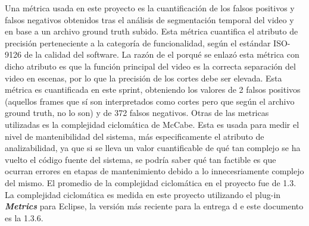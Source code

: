 \documentclass[a4paper]{article}
\begin{document}
Una métrica usada en este proyecto es la cuantificación de los falsos positivos y falsos negativos obtenidos tras el análisis de segmentación temporal del video y en base a un archivo ground truth subido. Esta métrica cuantifica el atributo de precisión perteneciente a la categoría de funcionalidad, según el estándar ISO-9126 de la calidad del software. La razón de el porqué se enlazó esta métrica con dicho atributo es que la función principal del video es la correcta separación del video en escenas, por lo que la precisión de los cortes debe ser elevada. Esta métrica es cuantificada en este sprint, obteniendo los valores de 2 falsos positivos (aquellos frames que sí son interpretados como cortes pero que según el archivo ground truth, no lo son) y de 372 falsos negativos. Otras de las metricas utilizadas es la complejidad ciclomática de McCabe. Esta es usada para medir el nivel de mantenibilidad del sistema, más especificamente el atributo de analizabilidad, ya que si se lleva un valor cuantificable de qué tan complejo se ha vuelto el código fuente del sistema, se podría saber qué tan factible es que ocurran errores en etapas de mantenimiento debido a lo innecesriamente complejo del mismo. El promedio de la complejidad ciclomática en el proyecto fue de 1.3. \\

La complejidad ciclomática es medida en este proyecto utilizando el plug-in \textbf{\textit{Metrics}} para Eclipse, la versión más reciente para la entrega d e este documento es la 1.3.6.\\ 
\end{document}
